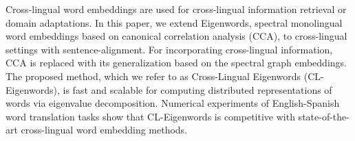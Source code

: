 Cross-lingual word embeddings are used for cross-lingual information retrieval or domain adaptations. In this paper, we extend Eigenwords, spectral monolingual word embeddings based on canonical correlation analysis (CCA), to cross-lingual settings with sentence-alignment. For incorporating cross-lingual information, CCA is replaced with its generalization based on the spectral graph embeddings. The proposed method, which we refer to as Cross-Lingual Eigenwords (CL-Eigenwords), is fast and scalable for computing distributed representations of words via eigenvalue decomposition. Numerical experiments of English-Spanish word translation tasks show that CL-Eigenwords is competitive with state-of-the-art cross-lingual word embedding methods.
